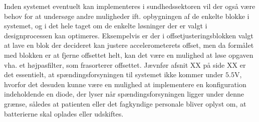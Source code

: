 \noindent Inden systemet eventuelt kan implementeres i sundhedssektoren vil der også være behov for at undersøge andre muligheder ift. opbygningen af de enkelte blokke i systemet, og i det hele taget om de enkelte løsninger der er valgt i designprocessen kan optimeres. Eksempelvis er der i offsetjusteringsblokken valgt at lave en blok der decideret kan justere accelerometerets offset, men da formålet med blokken er at fjerne offsettet helt, kan det være en mulighed at løse opgaven vha. et højpasfilter, som frasorterer offsettet. Jævnfør afsnit XX på side XX er det essentielt, at spændingsforsyningen til systemet ikke kommer under $5.5$V, hvorfor det desuden kunne være en mulighed at implementere en konfiguration indeholdende en diode, der lyser når spændingsforsyningen ligger under denne grænse, således at patienten eller det fagkyndige personale bliver oplyst om, at batterierne skal oplades eller udskiftes. 
  
 
 